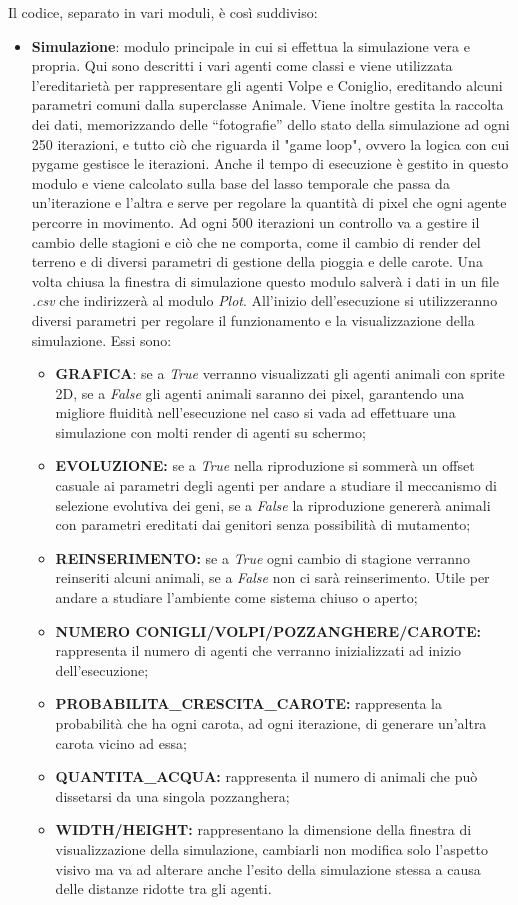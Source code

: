\documentclass[11pt]{article}
\begin{document}
Il codice, separato in vari moduli, è così suddiviso: \begin{itemize}
    \item \textbf{Simulazione}: modulo principale in cui si effettua la simulazione vera e propria. Qui sono descritti i vari agenti come classi e viene utilizzata l'ereditarietà per rappresentare gli agenti Volpe e Coniglio, ereditando alcuni parametri comuni dalla superclasse Animale. Viene inoltre gestita la raccolta dei dati, memorizzando delle “fotografie” dello stato della simulazione ad ogni 250 iterazioni, e tutto ciò che riguarda il "game loop", ovvero la logica con cui pygame gestisce le iterazioni. Anche il tempo di esecuzione è gestito in questo modulo e viene calcolato sulla base del lasso temporale che passa da un'iterazione e l'altra e serve per regolare la quantità di pixel che ogni agente percorre in movimento. Ad ogni 500 iterazioni un controllo va a gestire il cambio delle stagioni e ciò che ne comporta, come il cambio di render del terreno e di diversi parametri di gestione della pioggia e delle carote. Una volta chiusa la finestra di simulazione questo modulo salverà i dati in un file \textit{.csv} che indirizzerà al modulo \textit{Plot}. All'inizio dell'esecuzione si utilizzeranno diversi parametri per regolare il funzionamento e la visualizzazione della simulazione. Essi sono:
    \begin{itemize}
        \item \textbf{GRAFICA}: se a \textit{True} verranno visualizzati gli agenti animali con sprite 2D, se a \textit{False} gli agenti animali saranno dei pixel, garantendo una migliore fluidità nell'esecuzione nel caso si vada ad effettuare una simulazione con molti render di agenti su schermo;
        \item \textbf{EVOLUZIONE:} se a \textit{True} nella riproduzione si sommerà un offset casuale ai parametri degli agenti per andare a studiare il meccanismo di selezione evolutiva dei geni, se a \textit{False} la riproduzione genererà animali con parametri ereditati dai genitori senza possibilità di mutamento;
        \item \textbf{REINSERIMENTO:} se a \textit{True} ogni cambio di stagione verranno reinseriti alcuni animali, se a \textit{False} non ci sarà reinserimento. Utile per andare a studiare l'ambiente come sistema chiuso o aperto;
        \item \textbf{NUMERO CONIGLI/VOLPI/POZZANGHERE/CAROTE:}  rappresenta il numero di agenti che verranno inizializzati ad inizio dell’esecuzione;
        \item \textbf{PROBABILITA\_CRESCITA\_CAROTE:}  rappresenta la probabilità che ha ogni carota, ad ogni iterazione, di generare un’altra carota vicino ad essa;
        \item \textbf{QUANTITA\_ACQUA:}  rappresenta il numero di animali che può dissetarsi da una singola pozzanghera;
        \item \textbf{WIDTH/HEIGHT:}  rappresentano la dimensione della finestra di visualizzazione della simulazione, cambiarli non modifica solo l’aspetto visivo ma va ad alterare anche l’esito della simulazione stessa a causa delle distanze ridotte tra gli agenti.
    \end{itemize}
    

\end{itemize}
\end{document}
